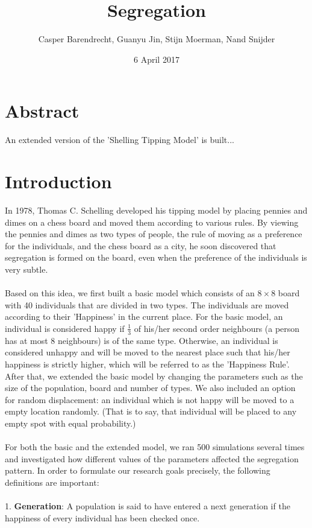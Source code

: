 \documentclass{article}
\title{Segregation}
\author{Casper Barendrecht, Guanyu Jin, Stijn Moerman, Nand Snijder}
\date{6 April 2017}
\begin{document}
\reversemarginpar 
\maketitle
\section{Abstract}
An extended version of the 'Shelling Tipping Model' is built...
\section{Introduction}
In 1978, Thomas C. Schelling developed his tipping model by placing pennies and dimes on a chess board and moved them according to various rules. By viewing the pennies and dimes as two types of people, the rule of moving as a preference for the individuals, and the chess board as a city, he soon discovered that segregation is formed on the board, even when the preference of the individuals is very subtle.\\
\\
Based on this idea, we first built a basic model which consists of an $8\times8$ board with 40 individuals that are divided in two types. The individuals are moved according to their 'Happiness' in the current place. For the basic model, an individual is considered happy if $\frac{1}{3}$ of his/her second order neighbours (a person has at most 8 neighbours) is of the same type. Otherwise, an individual is considered unhappy and will be moved to the nearest place such that his/her happiness is strictly higher, which will be referred to as the 'Happiness Rule'. After that, we extended the basic model by changing the parameters such as the size of the population, board and number of types. We also included an option for random displacement: an individual which is not happy will be moved to a empty location randomly. (That is to say, that individual will be placed to any empty spot with equal probability.)\\\\
For both the basic and the extended model, we ran 500 simulations several times and investigated how different values of the parameters affected the segregation pattern. In order to formulate our research goals precisely, the following definitions are important:\\
\\
1. \textbf{Generation}: A population is said to have entered a next generation if the happiness of every individual has been checked once. \\
\end{document}
